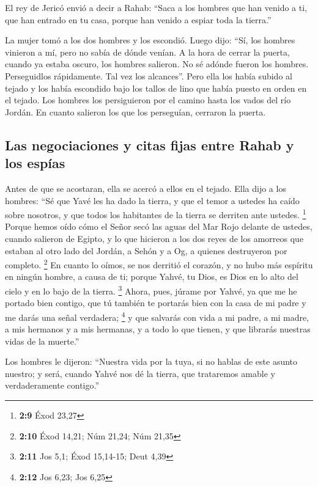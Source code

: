 \begin{paracol}{2}
 El rey de Jericó envió a decir a Rahab: ``Saca a los
hombres que han venido a ti, que han entrado en tu casa, porque han
venido a espiar toda la tierra.''

 La mujer tomó a los dos hombres y los escondió. Luego
dijo: ``Sí, los hombres vinieron a mí, pero no sabía de dónde venían.
 A la hora de cerrar la puerta, cuando ya estaba oscuro,
los hombres salieron. No sé adónde fueron los hombres. Perseguidlos
rápidamente. Tal vez los alcances''.  Pero ella los había
subido al tejado y los había escondido bajo los tallos de lino que había
puesto en orden en el tejado.  Los hombres los
persiguieron por el camino hasta los vados del río Jordán. En cuanto
salieron los que los perseguían, cerraron la puerta.

\hypertarget{las-negociaciones-y-citas-fijas-entre-rahab-y-los-espuxedas}{%
\subsection{Las negociaciones y citas fijas entre Rahab y los
espías}\label{las-negociaciones-y-citas-fijas-entre-rahab-y-los-espuxedas}}

 Antes de que se acostaran, ella se acercó a ellos en el
tejado.  Ella dijo a los hombres: ``Sé que Yavé les ha
dado la tierra, y que el temor a ustedes ha caído sobre nosotros, y que
todos los habitantes de la tierra se derriten ante ustedes. \footnote{\textbf{2:9}
  Éxod 23,27}  Porque hemos oído cómo el Señor secó las
aguas del Mar Rojo delante de ustedes, cuando salieron de Egipto, y lo
que hicieron a los dos reyes de los amorreos que estaban al otro lado
del Jordán, a Sehón y a Og, a quienes destruyeron por completo.
\footnote{\textbf{2:10} Éxod 14,21; Núm 21,24; Núm 21,35}
 En cuanto lo oímos, se nos derritió el corazón, y no
hubo más espíritu en ningún hombre, a causa de ti; porque Yahvé, tu
Dios, es Dios en lo alto del cielo y en lo bajo de la tierra.
\footnote{\textbf{2:11} Jos 5,1; Éxod 15,14-15; Deut 4,39}
 Ahora, pues, júrame por Yahvé, ya que me he portado bien
contigo, que tú también te portarás bien con la casa de mi padre y me
darás una señal verdadera; \footnote{\textbf{2:12} Jos 6,23; Jos 6,25}
 y que salvarás con vida a mi padre, a mi madre, a mis
hermanos y a mis hermanas, y a todo lo que tienen, y que librarás
nuestras vidas de la muerte.''

 Los hombres le dijeron: ``Nuestra vida por la tuya, si
no hablas de este asunto nuestro; y será, cuando Yahvé nos dé la tierra,
que trataremos amable y verdaderamente contigo.''


\end{paracol}
